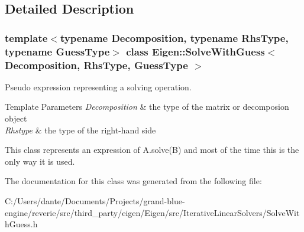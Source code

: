 \subsection{Detailed Description}
\subsubsection*{template$<$typename Decomposition, typename Rhs\+Type, typename Guess\+Type$>$\newline
class Eigen\+::\+Solve\+With\+Guess$<$ Decomposition, Rhs\+Type, Guess\+Type $>$}

Pseudo expression representing a solving operation. 


\begin{DoxyTemplParams}{Template Parameters}
{\em Decomposition} & the type of the matrix or decomposion object \\
\hline
{\em Rhstype} & the type of the right-\/hand side\\
\hline
\end{DoxyTemplParams}
This class represents an expression of A.\+solve(\+B) and most of the time this is the only way it is used. 

The documentation for this class was generated from the following file\+:\begin{DoxyCompactItemize}
\item 
C\+:/\+Users/dante/\+Documents/\+Projects/grand-\/blue-\/engine/reverie/src/third\+\_\+party/eigen/\+Eigen/src/\+Iterative\+Linear\+Solvers/Solve\+With\+Guess.\+h\end{DoxyCompactItemize}
